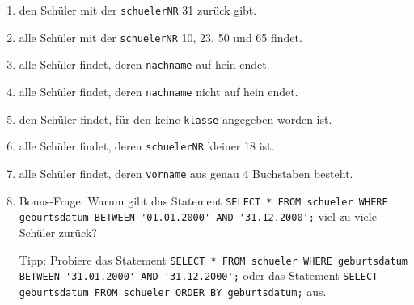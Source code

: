 \begin{Exercise}[title={Erstelle ein SELECT-Statement mit WHERE-Klausel, das}, label=Where]
	\begin{enumerate}
		\item den Schüler mit der \lstinline!schuelerNR! 31 zurück gibt.
		\item alle Schüler mit der \lstinline!schuelerNR! 10, 23, 50 und 65 findet.
		\item alle Schüler findet, deren \lstinline!nachname! auf hein endet.
		\item alle Schüler findet, deren \lstinline!nachname! nicht auf hein endet.
		\item den Schüler findet, für den keine \lstinline!klasse! angegeben worden ist.
		\item alle Schüler findet, deren \lstinline!schuelerNR! kleiner 18 ist.
		\item alle Schüler findet, deren \lstinline!vorname! aus genau 4 Buchstaben besteht.
		\item Bonus-Frage: Warum gibt das Statement \lstinline[breaklines=true]!SELECT * FROM schueler WHERE geburtsdatum BETWEEN '01.01.2000' AND '31.12.2000';! viel zu viele Schüler zurück?

		Tipp: Probiere das Statement \lstinline[breaklines=true]!SELECT * FROM schueler WHERE geburtsdatum BETWEEN '31.01.2000' AND '31.12.2000';! oder das Statement \lstinline!SELECT geburtsdatum FROM schueler ORDER BY geburtsdatum;! aus.
	\end{enumerate}
\end{Exercise}

